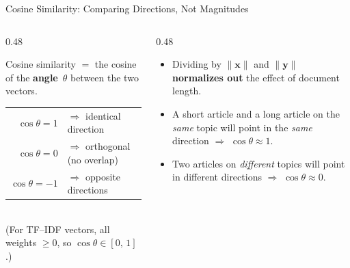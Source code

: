 \documentclass[aspectratio=169]{beamer}
\begin{document}
\begin{frame}{Cosine Similarity: Comparing Directions, Not Magnitudes}

\begin{columns}[T]
\begin{column}{0.48\textwidth}
\begin{tcolorbox}[colback=green!5!white, colframe=green!60!black,
  title=\textbf{Geometric intuition}]
Cosine similarity $=$ the cosine of the \textbf{angle}~$\theta$
between the two vectors.\\[6pt]
\begin{tabular}{rl}
$\cos\theta = 1$  & $\Rightarrow$ identical direction \\
$\cos\theta = 0$  & $\Rightarrow$ orthogonal (no overlap) \\
$\cos\theta = -1$ & $\Rightarrow$ opposite directions \\
\end{tabular}\\[6pt]
{\small (For TF--IDF vectors, all weights $\geq 0$,
so $\cos\theta \in [0,\,1]$.)}
\end{tcolorbox}
\end{column}

\begin{column}{0.48\textwidth}
\begin{tcolorbox}[colback=blue!5!white, colframe=blue!75!black,
  title=\textbf{Why this solves the problem}]
\begin{itemize}
\item Dividing by $\|\mathbf{x}\|$ and $\|\mathbf{y}\|$
      \textbf{normalizes out} the effect of document length.
\item A short article and a long article on the
      \emph{same} topic will point in the
      \emph{same} direction $\Rightarrow$ $\cos\theta \approx 1$.
\item Two articles on \emph{different} topics
      will point in different directions $\Rightarrow$ $\cos\theta \approx 0$.
\end{itemize}
\end{tcolorbox}
\end{column}
\end{columns}

\end{frame}
%
%
\end{document}
